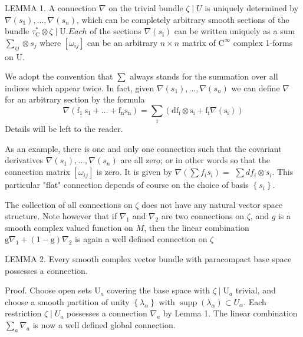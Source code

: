 \documentclass[10pt]{article}
\begin{document}
LEMMA 1. A connection $\nabla$ on the trivial bundle $\zeta \mid U$ is uniquely determined by $\nabla\left(s_{1}\right), \ldots, \nabla\left(s_{n}\right)$, which can be completely arbitrary smooth sections of the bundle $\tau_{\mathrm{C}}^{*} \otimes \zeta \mid \mathrm{U} . E a c h$ of the sections $\nabla\left(s_{\mathbf{i}}\right)$ can be written uniquely as a sum $\sum_{i j} \otimes s_{j}$ where $\left[\omega_{i j}\right]$ can be an arbitrary $n \times n$ matrix of $\mathrm{C}^{\infty}$ complex 1-forms on U.

We adopt the convention that $\sum$ always stands for the summation over all indices which appear twice. In fact, given $\nabla\left(s_{1}\right), \ldots, \nabla\left(s_{n}\right)$ we can define $\nabla$ for an arbitrary section by the formula
$$
\nabla\left(\mathrm{f}_{1} \mathrm{~s}_{1}+\ldots+\mathrm{f}_{\mathrm{n}} \mathrm{s}_{\mathrm{n}}\right)=\sum_{\mathrm{i}}\left(\mathrm{df}_{\mathrm{i}} \otimes \mathrm{s}_{\mathrm{i}}+\mathrm{f}_{\mathrm{i}} \nabla\left(\mathrm{s}_{\mathrm{i}}\right)\right)
$$
Details will be left to the reader.

As an example, there is one and only one connection such that the covariant derivatives $\nabla\left(s_{1}\right), \ldots, \nabla\left(s_{n}\right)$ are all zero; or in other words so that the connection matrix $\left[\omega_{i j}\right]$ is zero. It is given by $\nabla\left(\sum f_{i} s_{i}\right)=$ $\sum d f_{i} \otimes s_{i}$. This particular "flat" connection depends of course on the choice of basis $\left\{s_{i}\right\}$.

The collection of all connections on $\zeta$ does not have any natural vector space structure. Note however that if $\nabla_{1}$ and $\nabla_{2}$ are two connections on $\zeta$, and $g$ is a smooth complex valued function on $M$, then the linear combination $\mathrm{g} \nabla_{1}+(1-\mathrm{g}) \nabla_{2}$ is again a well defined connection on $\zeta$

LEMMA 2. Every smooth complex vector bundle with paracompact base space possesses a connection.

Proof. Choose open sets $\mathrm{U}_{a}$ covering the base space with $\zeta \mid \mathrm{U}_{a}$ trivial, and choose a smooth partition of unity $\left\{\lambda_{\alpha}\right\}$ with $\operatorname{supp}\left(\lambda_{\alpha}\right) \subset U_{\alpha}$. Each restriction $\zeta \mid U_{a}$ possesses a connection $\nabla_{a}$ by Lemma 1. The linear combination $\sum_{a} \nabla_{a}$ is now a well defined global connection.
\end{document}
